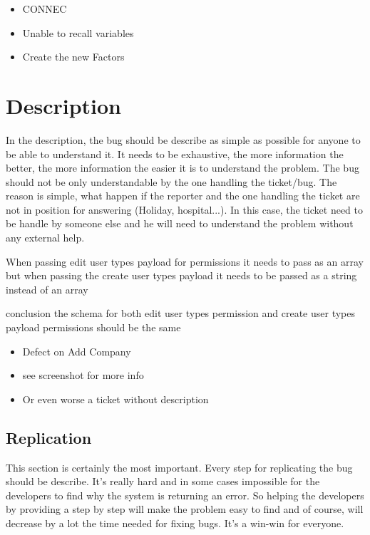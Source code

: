 \documentclass[a4paper,article,oneside]{memoir}
\begin{document}
\noindent{}

\begin{itemize}
  \item CONNEC
  \item Unable to recall variables
  \item Create the new Factors
\end{itemize}
	
		
        \chapter{Description}
        In the description, the bug should be describe as simple as possible for anyone to be able to understand it. It needs to be exhaustive, the more information the better, the more information the easier it is to understand the problem. The bug should not be only understandable by the one handling the ticket/bug. The reason is simple, what happen if the reporter and the one handling the ticket are not in position for answering (Holiday, hospital...). In this case, the ticket need to be handle by someone else and he will need to understand the problem without any external help.
        
\noindent{}

When passing edit user types payload for permissions it needs to pass as an array but
when passing the create user types payload it needs to be passed as a string instead of an array

conclusion the schema for both edit user types permission and create user types payload permissions should be the same

\noindent{}  

\begin{itemize}
  \item Defect on Add Company
  \item see screenshot for more info
  \item Or even worse a ticket without description
\end{itemize}
     
        \section{Replication}
        This section is certainly the most important. Every step for replicating the bug should be describe. It's really hard and in some cases impossible for the developers to find why the system is returning an error. So helping the developers by providing a step by step will make the problem easy to find and of course, will decrease by a lot the time needed for fixing bugs. It's a win-win for everyone.
\end{document}
